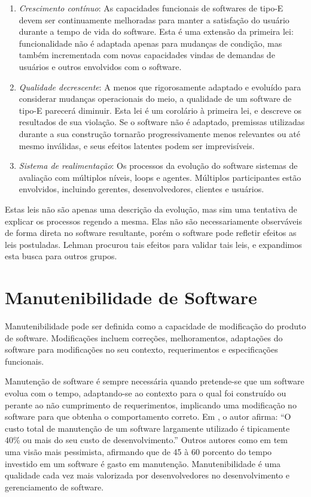 \begin{enumerate}
	\item \textit{Crescimento contínuo}: As capacidades funcionais de softwares de tipo-E devem ser continuamente melhoradas para manter a satisfação do usuário durante a tempo de vida do software. Esta é uma extensão da primeira lei: funcionalidade não é adaptada apenas para mudanças de condição, mas também incrementada com novas capacidades vindas de demandas de usuários e outros envolvidos com o software.
	\item \textit{Qualidade decrescente}: A menos que rigorosamente adaptado e evoluído para considerar mudanças operacionais do meio, a qualidade de um software de tipo-E parecerá diminuir. Esta lei é um corolário à primeira lei, e descreve os resultados de sua violação. Se o software não é adaptado, premissas utilizadas durante a sua construção tornarão progressivamente menos relevantes ou até mesmo inválidas, e seus efeitos latentes podem ser imprevisíveis.
	\item \textit{Sistema de realimentação}: Os processos da evolução do software sistemas de avaliação com múltiplos níveis, loops e agentes. Múltiplos participantes estão envolvidos, incluindo gerentes, desenvolvedores, clientes e usuários. 
\end{enumerate}

Estas leis não são apenas uma descrição da evolução, mas sim uma tentativa de explicar os processos regendo a mesma. Elas não são necessariamente observáveis de forma direta no software resultante, porém o software pode refletir efeitos as leis postuladas. Lehman procurou tais efeitos para validar tais leis, e expandimos esta busca para outros grupos.

\section{Manutenibilidade de Software} \label{sec:maintainability}

Manutenibilidade pode ser definida como a capacidade de modificação
do produto de software. Modificações incluem correções, melhoramentos,
adaptações do software para modificações no seu contexto, requerimentos
e especificações funcionais\cite{van1993software}.

Manutenção de software é sempre necessária quando pretende-se que
um software evolua com o tempo, adaptando-se ao contexto para o qual
foi construído ou perante ao não cumprimento de requerimentos, implicando
uma modificação no software para que obtenha o comportamento correto.
Em \cite{brooks1995mythical}, o autor afirma: ``O custo total de manutenção de um software largamente utilizado
é tipicamente 40\% ou mais do seu custo de desenvolvimento.''
Outros autores como em \cite{parikh1983tutorial}tem uma visão
mais pessimista, afirmando que de 45 à 60 porcento do tempo investido
em um software é gasto em manutenção. Manutenibilidade é uma qualidade
cada vez mais valorizada por desenvolvedores no desenvolvimento e
gerenciamento de software.

